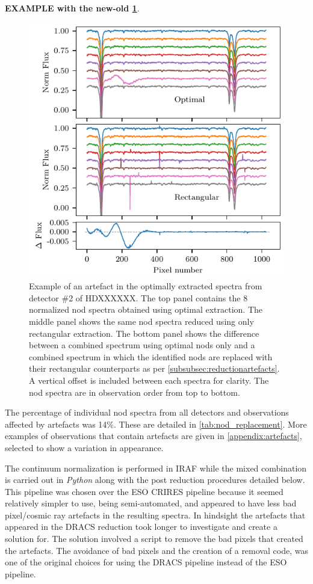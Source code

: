 \textbf{
EXAMPLE with the new-old \cref{fig:badpixelreplacement}}.
\begin{figure}
    \centering
    \includegraphics[width=\hsize/2]{figures/reduction/bp_plots/Bad_pixel_replacement}
    \caption{Example of an artefact in the optimally extracted spectra from detector \#2 of {\red{} HDXXXXXX}.
The top panel contains the 8 normalized nod spectra obtained using optimal extraction.
The middle panel shows the same nod spectra reduced using only rectangular extraction.
The bottom panel shows the difference between a combined spectrum using optimal nods only and a combined spectrum in which the identified nods are replaced with their rectangular counterparts as per \cref{subsubsec:reductionartefacts}.
A vertical offset is included between each spectra for clarity.
The nod spectra are in observation order from top to bottom.}
    \label{fig:badpixelreplacement}
\end{figure}

The percentage of individual nod spectra from all detectors and observations affected by artefacts was 14\%.
These are detailed in \cref{tab:nod_replacement}.
More examples of observations that contain artefacts are given in \cref{appendix:artefacts}, selected to show a variation in appearance.


The continuum normalization is performed in {IRAF} while the mixed combination is carried out in \emph{Python} along with the post reduction procedures detailed below.
This pipeline was chosen over the {ESO} {CRIRES} pipeline because it seemed relatively simpler to use, being semi-automated, and appeared to have less bad pixel/cosmic ray artefacts in the resulting spectra.
In hindsight the artefacts that appeared in the {DRACS} reduction took longer to investigate and create a solution for.
The solution involved a script to remove the bad pixels that created the artefacts.
The avoidance of bad pixels and the creation of a removal code, was one of the original choices for using the {DRACS} pipeline instead of the {ESO} pipeline.


